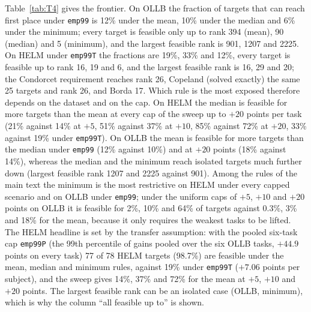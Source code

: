 \documentclass{article}
\begin{document}
Table~\ref{tab:T4} gives the frontier. On OLLB the fraction of targets that can reach first place under \texttt{emp99} is 12\% under the mean, 10\% under the median and 6\% under the minimum; every target is feasible only up to rank 394 (mean), 90 (median) and 5 (minimum), and the largest feasible rank is 901, 1207 and 2225. On HELM under \texttt{emp99T} the fractions are 19\%, 33\% and 12\%, every target is feasible up to rank 16, 19 and 6, and the largest feasible rank is 16, 29 and 20; the Condorcet requirement reaches rank 26, Copeland (solved exactly) the same 25 targets and rank 26, and Borda 17. Which rule is the most exposed therefore depends on the dataset and on the cap. On HELM the median is feasible for more targets than the mean at every cap of the sweep up to $+20$ points per task (21\% against 14\% at $+5$, 51\% against 37\% at $+10$, 85\% against 72\% at $+20$, 33\% against 19\% under \texttt{emp99T}). On OLLB the mean is feasible for more targets than the median under \texttt{emp99} (12\% against 10\%) and at $+20$ points (18\% against 14\%), whereas the median and the minimum reach isolated targets much further down (largest feasible rank 1207 and 2225 against 901). Among the rules of the main text the minimum is the most restrictive on HELM under every capped scenario and on OLLB under \texttt{emp99}; under the uniform caps of $+5$, $+10$ and $+20$ points on OLLB it is feasible for 2\%, 10\% and 64\% of targets against 0.3\%, 3\% and 18\% for the mean, because it only requires the weakest tasks to be lifted. The HELM headline is set by the transfer assumption: with the pooled six-task cap \texttt{emp99P} (the 99th percentile of gains pooled over the six OLLB tasks, $+44.9$ points on every task) 77 of 78 HELM targets (98.7\%) are feasible under the mean, median and minimum rules, against 19\% under \texttt{emp99T} ($+7.06$ points per subject), and the sweep gives 14\%, 37\% and 72\% for the mean at $+5$, $+10$ and $+20$ points. The largest feasible rank can be an isolated case (OLLB, minimum), which is why the column ``all feasible up to'' is shown.

\begin{table}[t]
\caption{Feasibility frontier under the primary cap (\texttt{emp99} on OLLB, \texttt{emp99T} on HELM) and the oracle cap (\texttt{ceil}). \emph{share}: fraction of targets for which first place is reachable (Wilson 95\% intervals); $r^*$: largest rank under the mean among feasible targets (may be an isolated case); \emph{all feas.\ up to}: largest $r$ such that every target of rank $\le r$ is feasible; \emph{first bin $<$ 1/2}: first rank bin (bins double from rank 2) in which fewer than half are feasible. $^\dagger$: the 50 best targets under the mean only, not comparable with the score rules' fractions. Generated by \texttt{figures/src/tables.py}.}
\label{tab:T4}
\centering\scriptsize
\resizebox{\linewidth}{!}{}\\[4pt]
\resizebox{\linewidth}{!}{}
\end{table}
\end{document}

